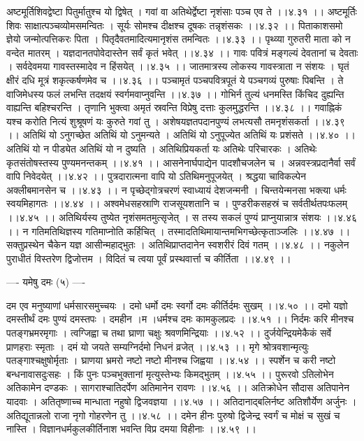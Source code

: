 \documentclass[11pt]{book}
\begin{document}
\begin{landscape}
अष्टमूर्तिशिवद्वेष्टा पितुर्मातुश्च यो द्विषेत् ।
गवां वा अतिथेर्द्वेष्टा नृशंसाः पञ्च एव ते ।।४.३१ ।।
अष्टमूर्तिः शिवः साक्षात्पञ्चव्योमसमन्वितः ।
सूर्यः सोमश्च दीक्षश्च दूषकः तन्नृशंसकः ।।४.३२ ।।
पिताकाशसमो ज्ञेयो जन्मोत्पत्तिकरः पिता ।
पितृदैवतमादित्यमानृशंस तमन्वितः ।।४.३३ ।।
पृथ्व्या गुरुतरी माता को न वन्देत मातरम् ।
यज्ञदानतपोवेदास्तेन सर्वं कृतं भवेत् ।।४.३४ ।।
गावः पवित्रं मङ्गल्यं देवतानां च देवताः ।
सर्वदेवमया गावस्तस्मादेव न हिंसयेत् ।।४.३५ ।।
जातमात्रस्य लोकस्य गावस्त्राता न संशयः ।
घृतं क्षीरं दधि मूत्रं शकृत्कर्षणमेव च ।।४.३६ ।।
पञ्चामृतं पञ्चपवित्रपूतं
ये पञ्चगव्यं पुरुषाः पिबन्ति ।
ते वाजिमेधस्य फलं लभन्ति
तदक्षयं स्वर्गमवाप्नुवन्ति ।।४.३७ ।।
गोभिर्न तुल्यं धनमस्ति किंचिद
दुह्यन्ति वाह्यन्ति बहिश्चरन्ति ।
तृणानि भुक्त्वा अमृतं स्रवन्ति
विप्रेषु दत्ताः कुलमुद्धरन्ति ।।४.३८ ।।
गवाह्निकं यश्च करोति नित्यं
शुश्रूषणं यः कुरुते गवां तु ।
अशेषयज्ञतपदानपुण्यं
लभत्यसौ तमनृशंसकर्ता ।।४.३९ ।।
अतिथिं यो ऽनुगच्छेत अतिथिं यो ऽनुमन्यते ।
अतिथिं यो ऽनुपूज्येत अतिथिं यः प्रशंसते ।।४.४० ।।
अतिथिं यो न पीड्येत अतिथिं यो न दुष्यति ।
अतिथिप्रियकर्ता यः अतिथेः परिचारकः ।
अतिथेः कृतसंतोषस्तस्य पुण्यमनन्तकम् ।।४.४१ ।।
आसनेनार्घपाद्येन पादशौचजलेन च ।
अन्नवस्त्रप्रदानैर्वा सर्वं वापि निवेदयेत् ।।४.४२ ।।
पुत्रदारात्मना वापि यो ऽतिथिमनुपूजयेत् ।
श्रद्धया चाविकल्पेन अक्लीबमानसेन च ।।४.४३ ।।
न पृच्छेद्गोत्रचरणं स्वाध्यायं देशजन्मनी ।
चिन्तयेन्मनसा भक्त्या धर्मः स्वयमिहागतः ।।४.४४ ।।
अश्वमेधसहस्राणि राजसूयशतानि च ।
पुण्डरीकसहस्रं च सर्वतीर्थतपःफलम् ।।४.४५ ।।
अतिथिर्यस्य तुष्येत नृशंसमतमुत्सृजेत् ।
स तस्य सकलं पुण्यं प्राप्नुयान्नात्र संशयः ।।४.४६ ।।
न गतिमतिथिज्ञस्य गतिमाप्नोति कर्हिचित् ।
तस्मादतिथिमायान्तमभिगच्छेत्कृताञ्जलिः ।।४.४७ ।।
सक्तुप्रस्थेन चैकेन यज्ञ आसीन्महाद्भुतः ।
अतिथिप्राप्तदानेन स्वशरीरं दिवं गतम् ।।४.४८ ।।
नकुलेन पुराधीतं विस्तरेण द्विजोत्तम ।
विदितं च त्वया पूर्वं प्रस्थवार्त्ता च कीर्तिता ।।४.४९ ।।

---- यमेषु दमः (५) ----

दम एव मनुष्याणां धर्मसारसमुच्चयः ।
दमो धर्मो दमः स्वर्गो दमः कीर्तिर्दमः सुखम् ।।४.५० ।।
दमो यज्ञो दमस्तीर्थं दमः पुण्यं दमस्तपः ।
दमहीन{ ।}म{ ।}धर्मश्च दमः कामकुलप्रदः ।।४.५१ ।।
निर्दमः करि मीनश्च पतङ्गभ्रमरमृगाः ।
त्वग्जिह्वा च तथा घ्राणा चक्षुः श्रवणमिन्द्रियाः ।।४.५२ ।।
दुर्जयेन्द्रियमेकैकं सर्वे प्राणहराः स्मृताः ।
दमं यो जयते सम्यग्निर्दमो निधनं व्रजेत् ।।४.५३ ।।
मृगे श्रोत्रवशान्मृत्युः पतङ्गाश्चक्षुषोर्मृताः ।
घ्राणया भ्रमरो नष्टो नष्टो मीनश्च जिह्वया ।।४.५४ ।।
स्पर्शेन च करी नष्टो बन्धनावासदुःसहः ।
किं पुनः पञ्चभुक्तानां मृत्युस्तेभ्यः किमद्भुतम् ।।४.५५ ।।
पुरूरवो ऽतिलोभेन अतिकामेन दण्डकः ।
सागराश्चातिदर्पेण अतिमानेन रावणः ।।४.५६ ।।
अतिक्रोधेन सौदास अतिपानेन यादवाः ।
अतितृष्णाच्च मान्धाता नहुषो द्विजवज्ञया ।।४.५७ ।।
अतिदानाद्बलिर्नष्ट अतिशौर्येण अर्जुनः ।
अतिद्यूतान्नलो राजा नृगो गोहरणेन तु ।।४.५८ ।।
दमेन हीनः पुरुषो द्विजेन्द्र
स्वर्गं च मोक्षं च सुखं च नास्ति ।
विज्ञानधर्मकुलकीर्तिनाश
भवन्ति विप्र दमया विहीनाः ।।४.५९ ।।


\end{landscape}
\end{document}
